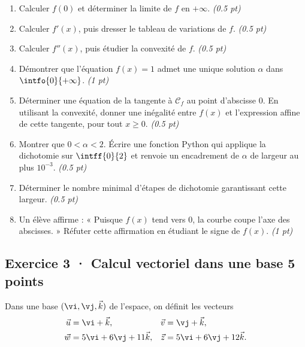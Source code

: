 \begin{enumerate}

\item Calculer $f(0)$ et déterminer la limite de $f$ en $+\infty$. \hfill\textit{(\num{0,5} pt)}

\item Calculer $f' (x)$, puis dresser le tableau de variations de $f$. \hfill\textit{(\num{0,5} pt)}

\item Calculer $f'' (x)$, puis étudier la convexité de $f$. \hfill\textit{(\num{0,5} pt)}

\item Démontrer que l'équation $f(x)=1$ admet une unique solution $\alpha$ dans $\intfo{0}{+\infty}$. \hfill\textit{(1 pt)}

\item Déterminer une équation de la tangente à $\mathcal C_f$ au point d'abscisse $0$. En utilisant la convexité, donner une inégalité entre $f(x)$ et l'expression affine de cette tangente, pour tout $x\ge0$. \hfill\textit{(\num{0,5} pt)}

\item Montrer que $0<\alpha<2$. Écrire une fonction Python qui applique la dichotomie sur $\intff{0}{2}$ et renvoie un encadrement de $\alpha$ de largeur au plus $10^{-3}$. \hfill\textit{(\num{0,5} pt)}

\item Déterminer le nombre minimal d'étapes de dichotomie garantissant cette largeur. \hfill\textit{(\num{0,5} pt)}

\item Un élève affirme : « Puisque $f(x)$ tend vers $0$, la courbe coupe l'axe des abscisses. » Réfuter cette affirmation en étudiant le signe de $f(x)$. \hfill\textit{(1 pt)}

\end{enumerate}

\mxnewpage{}

\subsection*{Exercice 3 · Calcul vectoriel dans une base \hfill 5 points}Dans une base $(\vi,\vj,\vec k)$ de l'espace, on définit les vecteurs
\[\begin{aligned}\vec u&=\vi+\vec k,&\vec v&=\vj+\vec k,\\
\vec w&=5\vi+6\vj+11\vec k,&\vec z&=5\vi+6\vj+12\vec k.\end{aligned}\]

